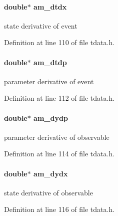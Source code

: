 \paragraph[{am\+\_\+dtdx}]{\setlength{\rightskip}{0pt plus 5cm}double$\ast$ am\+\_\+dtdx}\label{struct_temp_data_a5fea9eb6e03adbeb2e5c613f00078200}
state derivative of event 

Definition at line 110 of file tdata.\+h.

\hypertarget{struct_temp_data_a270f8db43a6d39783954403593bdd584}{}
\paragraph[{am\+\_\+dtdp}]{\setlength{\rightskip}{0pt plus 5cm}double$\ast$ am\+\_\+dtdp}\label{struct_temp_data_a270f8db43a6d39783954403593bdd584}
parameter derivative of event 

Definition at line 112 of file tdata.\+h.

\hypertarget{struct_temp_data_a444afdf86ee9a2fa21a406665b8e680a}{}
\paragraph[{am\+\_\+dydp}]{\setlength{\rightskip}{0pt plus 5cm}double$\ast$ am\+\_\+dydp}\label{struct_temp_data_a444afdf86ee9a2fa21a406665b8e680a}
parameter derivative of observable 

Definition at line 114 of file tdata.\+h.

\hypertarget{struct_temp_data_a6ae1bc06c2372a7de4fc2195a7562fa6}{}
\paragraph[{am\+\_\+dydx}]{\setlength{\rightskip}{0pt plus 5cm}double$\ast$ am\+\_\+dydx}\label{struct_temp_data_a6ae1bc06c2372a7de4fc2195a7562fa6}
state derivative of observable 

Definition at line 116 of file tdata.\+h.

\hypertarget{struct_temp_data_a3ddc8a88947f557500d6df4aeb09b18a}{}
